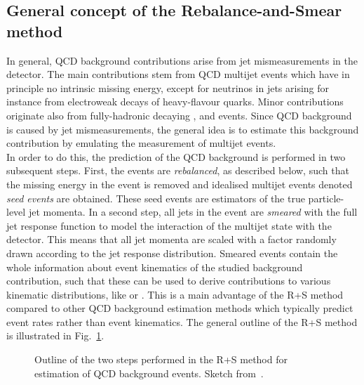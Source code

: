 \subsection{General concept of the Rebalance-and-Smear method}
\label{subsec:RPlusS_concept} 
In general, QCD background contributions arise from jet mismeasurements in the detector. The main contributions stem from QCD multijet events which have in principle no intrinsic missing energy, except for neutrinos in jets arising for instance from electroweak decays of heavy-flavour quarks. Minor contributions originate also from fully-hadronic decaying \ttbar, \WJets and \ZJets events. Since QCD background is caused by jet mismeasurements, the general idea is to estimate this background contribution by emulating the measurement of multijet events. \\
In order to do this, the prediction of the QCD background is performed in two subsequent steps. First, the events are \textit{rebalanced}, as described below, such that the missing energy in the event is removed and idealised multijet events denoted \textit{seed events} are obtained. These seed events are estimators of the true particle-level jet momenta. In a second step, all jets in the event are \textit{smeared} with the full jet response function to model the interaction of the multijet state with the detector. This means that all jet momenta are scaled with a factor randomly drawn according to the jet response distribution. Smeared events contain the whole information about event kinematics of the studied background contribution, such that these can be used to derive contributions to various kinematic distributions, like \HT or \MHT. This is a main advantage of the R+S method compared to other QCD background estimation methods which typically predict event rates rather than event kinematics. The general outline of the R+S method is illustrated in Fig.~\ref{fig:RPlusS_concept}.
\begin{figure}[!t]
  \centering
  \caption{Outline of the two steps performed in the R+S method for estimation of QCD background events. Sketch from~\cite{thesis:Schroeder}.}
  \label{fig:RPlusS_concept}
\end{figure}

